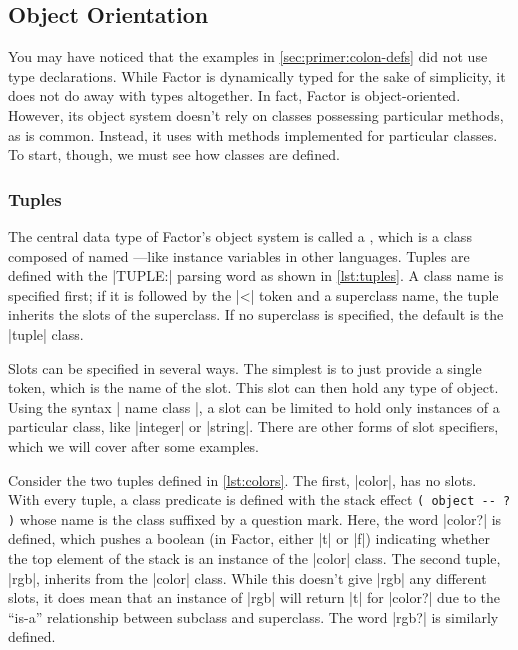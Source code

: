 \subsection{Object Orientation}\label{sec:primer:oo}

You may have noticed that the examples in \cref{sec:primer:colon-defs} did not
use type declarations.  While Factor is dynamically typed for the sake of
simplicity, it does not do away with types altogether.  In fact, Factor is
object-oriented.  However, its object system doesn't rely on classes possessing
particular methods, as is common.  Instead, it uses  with
methods implemented for particular classes.  To start, though, we must see how
classes are defined.

\subsubsection{Tuples}


The central data type of Factor's object system is called a , which
is a class composed of named ---like instance variables in other
languages.  Tuples are defined with the \factor|TUPLE:| parsing word as shown
in \vref{lst:tuples}.  A class name is specified first; if it is followed by
the \factor|<| token and a superclass name, the tuple inherits the slots of the
superclass.  If no superclass is specified, the default is the \factor|tuple|
class.

Slots can be specified in several ways.  The simplest is to just provide a
single token, which is the name of the slot.  This slot can then hold any type
of object.  Using the syntax
%
\factor|{ name class }|,
%
a slot can be limited to hold only instances of a particular class, like
\factor|integer| or \factor|string|.  There are other forms of slot specifiers,
which we will cover after some examples.


Consider the two tuples defined in \vref{lst:colors}.  The first,
\factor|color|, has no slots.  With every tuple, a class predicate is defined
with the stack effect
%
\verb|( object -- ? )|
%
whose name is the class suffixed by a question mark.  Here, the word
\factor|color?| is defined, which pushes a boolean (in Factor, either
\factor|t| or \factor|f|) indicating whether the top element of the stack is an
instance of the \factor|color| class.  The second tuple, \factor|rgb|, inherits
from the \factor|color| class.  While this doesn't give \factor|rgb| any
different slots, it does mean that an instance of \factor|rgb| will return
\factor|t| for \factor|color?| due to the ``is-a'' relationship between
subclass and superclass.  The word \factor|rgb?| is similarly defined.

